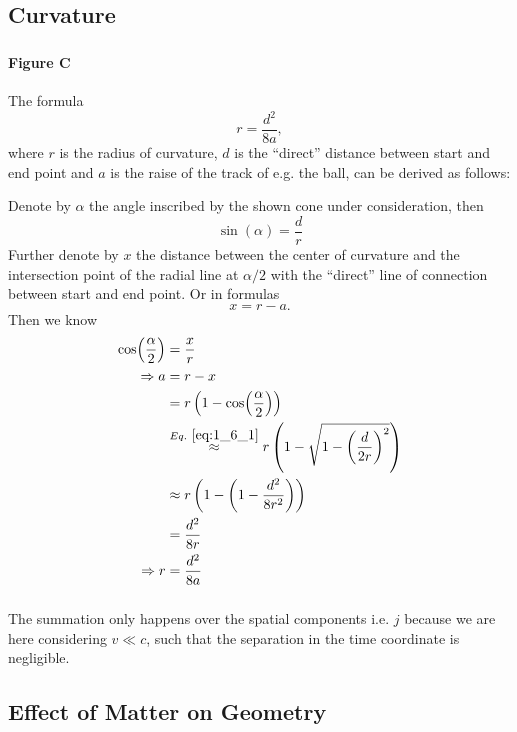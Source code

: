 \subsection{Curvature}\label{susec:1_6}
\subsubsection{ }
\paragraph{Figure C}
The formula \[r=\dfrac{d^2}{8 a},\]
where $r$ is the radius of curvature, $d$ is the \enquote{direct} distance between start and end point 
and $a$ is the raise of the track of e.g. the ball, can be derived as follows:

Denote by $\alpha$ the angle inscribed by the shown cone under consideration, then
\begin{equation} 
	\sin(\alpha)=\dfrac{d}{r} \label{eq:1_6_1}
\end{equation}
 Further denote by $x$ the distance between the center of curvature and the intersection point of the radial line at $\alpha/2$ with the \enquote{direct} line of connection between start and end point. Or in formulas \[x=r-a.\]
 Then we know
 \begin{align*} 
 	\cos(\dfrac{\alpha}{2})&=\dfrac{x}{r}\\
	\Rightarrow a&=r-x\\
	&=r\left(1-\cos(\dfrac{\alpha}{2})\right)\\
	&\overset{\crefeq{1_6_1}}{\approx}r\left(1-\sqrt{1-\left(\dfrac{d}{2r}\right)^2}\right)\\
	&\approx r\left(1-\left(1-\dfrac{d^2}{8r^2}\right)\right)\\
	&=\dfrac{d^2}{8r}\\
	\Rightarrow r &=\dfrac{d^2}{8a}
 \end{align*}

\subsubsection{ }
The summation only happens over the spatial components i.e. $j$ because we are here considering $v\ll c$, such that the separation in the time coordinate is negligible.


\subsection{Effect of Matter on Geometry}\label{susec:1_7}
